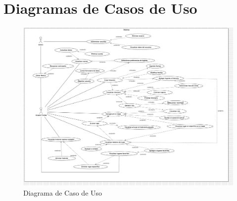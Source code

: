 \section{Diagramas de Casos de Uso}
    \begin{figure}[htb]
        \centering
        \includegraphics[width= 18cm]{caso_de_usov2.jpg}
        \caption{Diagrama de Caso de Uso}
        \label{fig:enter-label}
    \end{figure}
